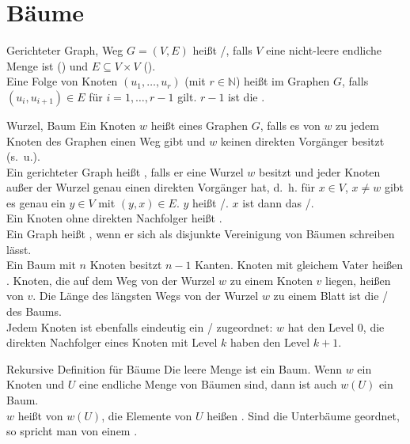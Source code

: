 \section{%
    Bäume%
}

\begin{Def}{Gerichteter Graph, Weg}
    $G = (V, E)$ heißt /, falls
    $V$ eine nicht-leere endliche Menge ist () und
    $E \subseteq V \times V$ (). \\
    Eine Folge von Knoten $(u_1, \ldots, u_r)$ (mit $r \in \mathbb{N}$) heißt
     im Graphen $G$, falls $(u_i, u_{i+1}) \in E$
    für $i = 1, \ldots, r - 1$ gilt.
    $r - 1$ ist die .
\end{Def}

\begin{Def}{Wurzel, Baum}
    Ein Knoten $w$ heißt  eines Graphen $G$, falls es von $w$
    zu jedem Knoten des Graphen einen Weg gibt und $w$ keinen direkten
    Vorgänger besitzt (s.~u.). \\
    Ein gerichteter Graph heißt , falls er eine Wurzel $w$
    besitzt und jeder Knoten außer der Wurzel genau einen direkten Vorgänger
    hat, d.~h. für $x \in V$, $x \not= w$ gibt es genau ein $y \in V$ mit
    $(y, x) \in E$.
    $y$ heißt /.
    $x$ ist dann das /. \\
    Ein Knoten ohne direkten Nachfolger heißt . \\
    Ein Graph heißt , wenn er sich als disjunkte Vereinigung
    von Bäumen schreiben lässt. \\
    Ein Baum mit $n$ Knoten besitzt $n - 1$ Kanten.
    Knoten mit gleichem Vater heißen .
    Knoten, die auf dem Weg von der Wurzel $w$ zu einem Knoten $v$
    liegen, heißen  von $v$.
    Die Länge des längsten Wegs von der Wurzel $w$ zu einem Blatt ist die
    / des Baums. \\
    Jedem Knoten ist ebenfalls eindeutig ein /
    zugeordnet: $w$ hat den Level $0$, die direkten Nachfolger eines Knoten
    mit Level $k$ haben den Level $k + 1$.
\end{Def}

\begin{Def}{Rekursive Definition für Bäume}
    Die leere Menge ist ein Baum. Wenn $w$ ein Knoten und $U$ eine endliche
    Menge von Bäumen sind, dann ist auch $w(U)$ ein Baum. \\
    $w$ heißt  von $w(U)$, die Elemente von $U$ heißen
    . Sind die Unterbäume geordnet, so spricht man von
    einem .
\end{Def}

